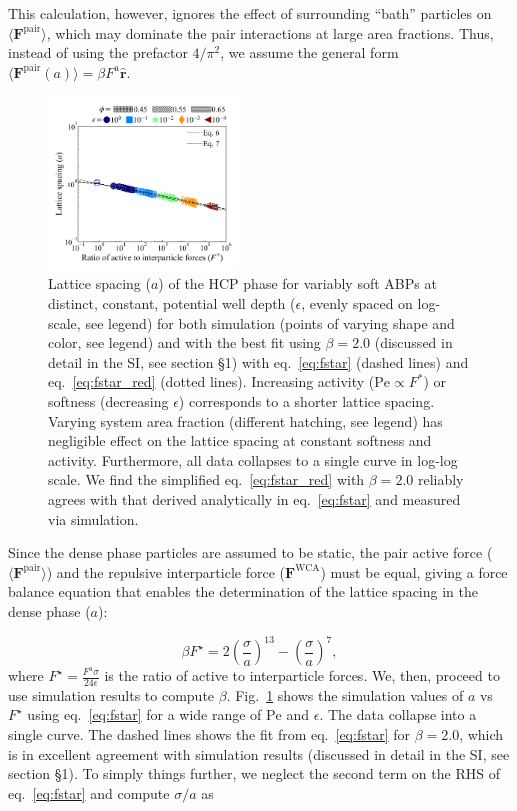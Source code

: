 \documentclass[twoside,twocolumn,9pt]{article}
\begin{document}
\noindent This calculation, however, ignores the effect of surrounding ``bath'' particles on $\langle\mathbf{F}^\text{pair}\rangle$, which may dominate the pair interactions at large area fractions. Thus, instead of using the prefactor $4/\pi^2$, 
we assume the general form  $\langle\mathbf{F}^\text{pair}(a)\rangle=\beta {F}^\text{a}\hat{\mathbf{r}}$. 

\begin{figure}%
\centering
  \includegraphics[width=0.45\textwidth,trim={1.2cm 1.2cm 1.3cm 1.4cm},clip]{figure_2.png}
  \caption{Lattice spacing ($a$) of the HCP phase for variably soft ABPs at distinct, constant, potential well depth ($\epsilon$, evenly spaced on log-scale, see legend) for both simulation (points of varying shape and color, see legend) and with the best fit using $\beta=2.0$ (discussed in detail in the SI, see section \S 1) with eq.~\ref{eq:fstar} (dashed lines) and eq.~\ref{eq:fstar_red} (dotted lines). Increasing activity ($\mathrm{Pe}\propto F^*$) or softness (decreasing $\epsilon$) corresponds to a shorter lattice spacing. Varying system area fraction (different hatching, see legend) has negligible effect on the lattice spacing at constant softness and activity. Furthermore, all data collapses to a single curve in log-log scale. We find the simplified eq.~\ref{eq:fstar_red} with $\beta=2.0$ reliably agrees with that derived analytically in eq.~\ref{eq:fstar} and measured via simulation.}
  \label{lat_derive}
\end{figure}

Since the dense phase particles are assumed to be static, the pair active force ($\langle\mathbf{F}^{\text{pair}}\rangle$) and the repulsive interparticle force ($\mathbf{F}^\text{WCA}$) must be equal, giving a force balance equation that enables the determination of the lattice spacing in the dense phase ($a$): 

\begin{equation}
    \beta F^\star = 2\left(\frac{\sigma}{a}\right)^{13} -\left(\frac{\sigma}{a}\right)^7,
    \label{eq:fstar}
\end{equation}
where $F^\star=\frac{F^\text{a} \sigma}{24\epsilon}$ is the ratio of active to interparticle forces. We, then, proceed to use simulation results to compute $\beta$. Fig.~\ref{lat_derive} shows the simulation values of $a$ vs $F^\star$ using eq.~\ref{eq:fstar} for a wide range of $\mathrm{Pe}$ and $\epsilon$. 
The data collapse into a single curve. The dashed lines shows the fit from eq.~\ref{eq:fstar} for $\beta=2.0$, which is in excellent agreement with simulation results (discussed in detail in the SI, see section \S 1). To simply things further, we neglect the second term on the RHS of eq.~\ref{eq:fstar} and compute $\sigma/a$ as
\end{document}
